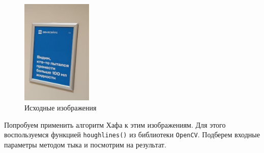 \documentclass[a4paper,12pt]{article}
\begin{document}
\begin{figure}[H]
\begin{minipage}{0.48\textwidth}
    \end{minipage}
    \includegraphics[width=0.3\textwidth]{images/aviasales.png}
    \caption{Исходные изображения}
\end{figure}

\noindent Попробуем применить алгоритм Хафа к этим изображениям. Для этого воспользуемся функцией \texttt{houghlines()} из библиотеки \texttt{OpenCV}. Подберем входные параметры методом тыка и посмотрим на результат.
\end{document}
